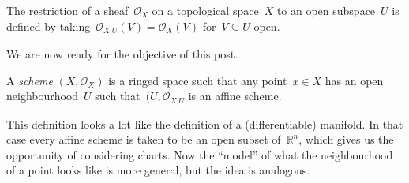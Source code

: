 \begin{definition}
  The restriction of a sheaf~$\mathcal{O}_X$ on a topological space~$X$ to an open subspace~$U$ is defined by taking~$\mathcal{O}_{X|U}(V)=\mathcal{O}_X(V)$ for~$V\subseteq U$ open.
\end{definition}

We are now ready for the objective of this post.

\begin{definition}
  A \emph{scheme} $(X,\mathcal{O}_X)$ is a ringed space such that any point~$x\in X$ has an open neighbourhood~$U$ such that~$(U,\mathcal{O}_{X|U}$ is an affine scheme.
\end{definition}

This definition looks a lot like the definition of a (differentiable) manifold. In that case every affine scheme is taken to be an open subset of~$\mathbb{R}^n$, which gives us the opportunity of considering charts. Now the ``model'' of what the neighbourhood of a point looks like is more general, but the idea is analogous.

